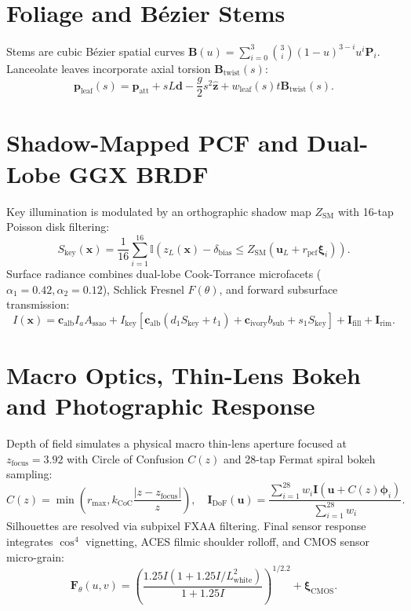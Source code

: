 \documentclass[10pt,twocolumn]{article}
\begin{document}
\section{Foliage and Bézier Stems}
Stems are cubic Bézier spatial curves $\mathbf{B}(u) = \sum_{i=0}^3 \binom{3}{i}(1-u)^{3-i}u^i \mathbf{P}_i$.
Lanceolate leaves incorporate axial torsion $\mathbf{B}_{\mathrm{twist}}(s)$:
\begin{equation}
\mathbf{p}_{\mathrm{leaf}}(s) = \mathbf{p}_{\mathrm{att}} + s L \mathbf{d} - \frac{g}{2} s^2 \hat{\mathbf{z}} + w_{\mathrm{leaf}}(s) t \mathbf{B}_{\mathrm{twist}}(s).
\end{equation}

\section{Shadow-Mapped PCF and Dual-Lobe GGX BRDF}
Key illumination is modulated by an orthographic shadow map $Z_{\mathrm{SM}}$ with 16-tap Poisson disk filtering:
\begin{equation}
S_{\mathrm{key}}(\mathbf{x}) = \frac{1}{16} \sum_{i=1}^{16} \mathbb{I}\left( z_L(\mathbf{x}) - \delta_{\mathrm{bias}} \le Z_{\mathrm{SM}}(\mathbf{u}_L + r_{\mathrm{pcf}} \boldsymbol{\xi}_i) \right).
\end{equation}
Surface radiance combines dual-lobe Cook-Torrance microfacets ($\alpha_1 = 0.42, \alpha_2 = 0.12$), Schlick Fresnel $F(\theta)$, and forward subsurface transmission:
\begin{equation}
I(\mathbf{x}) = \mathbf{c}_{\mathrm{alb}} I_a A_{\mathrm{ssao}} + I_{\mathrm{key}} \left[ \mathbf{c}_{\mathrm{alb}}(d_1 S_{\mathrm{key}} + t_1) + \mathbf{c}_{\mathrm{ivory}} b_{\mathrm{sub}} + s_1 S_{\mathrm{key}} \right] + \mathbf{I}_{\mathrm{fill}} + \mathbf{I}_{\mathrm{rim}}.
\end{equation}

\section{Macro Optics, Thin-Lens Bokeh and Photographic Response}
Depth of field simulates a physical macro thin-lens aperture focused at $z_{\mathrm{focus}} = 3.92$ with Circle of Confusion $C(z)$ and 28-tap Fermat spiral bokeh sampling:
\begin{equation}
C(z) = \min\left( r_{\max}, k_{\mathrm{CoC}} \frac{|z - z_{\mathrm{focus}}|}{z} \right), \quad \mathbf{I}_{\mathrm{DoF}}(\mathbf{u}) = \frac{\sum_{i=1}^{28} w_i \mathbf{I}(\mathbf{u} + C(z) \boldsymbol{\phi}_i)}{\sum_{i=1}^{28} w_i}.
\end{equation}
Silhouettes are resolved via subpixel FXAA filtering. Final sensor response integrates $\cos^4$ vignetting, ACES filmic shoulder rolloff, and CMOS sensor micro-grain:
\begin{equation}
\mathbf{F}_\theta(u, v) = \left( \frac{1.25 I(1 + 1.25 I / L_{\mathrm{white}}^2)}{1 + 1.25 I} \right)^{1 / 2.2} + \boldsymbol{\xi}_{\mathrm{CMOS}}.
\end{equation}
\end{document}
